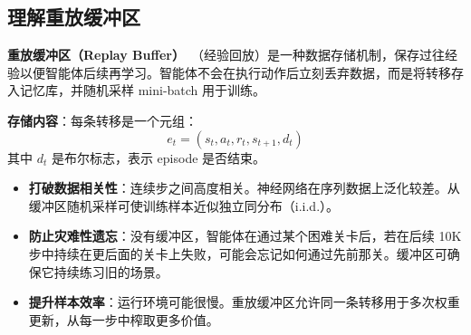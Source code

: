 \subsection{理解重放缓冲区}
\label{understanding-replay-buffers}

\textbf{重放缓冲区（Replay Buffer）}~\cite{lin1992self}（经验回放）是一种数据存储机制，保存过往经验以便智能体后续再学习。智能体不会在执行动作后立刻丢弃数据，而是将转移存入记忆库，并随机采样 mini-batch 用于训练。

\textbf{存储内容}：每条转移是一个元组：
\begin{equation}
e_t = (s_t, a_t, r_t, s_{t+1}, d_t)
\end{equation}
其中 $d_t$ 是布尔标志，表示 episode 是否结束。

\begin{keybox}[为何重放缓冲区不可或缺]
\begin{itemize}
  \item \textbf{打破数据相关性}：连续步之间高度相关。神经网络在序列数据上泛化较差。从缓冲区随机采样可使训练样本近似独立同分布（i.i.d.）。
  \item \textbf{防止灾难性遗忘}：没有缓冲区，智能体在通过某个困难关卡后，若在后续 10K 步中持续在更后面的关卡上失败，可能会忘记如何通过先前那关。缓冲区可确保它持续练习旧的场景。
  \item \textbf{提升样本效率}：运行环境可能很慢。重放缓冲区允许同一条转移用于多次权重更新，从每一步中榨取更多价值。
\end{itemize}
\end{keybox}

